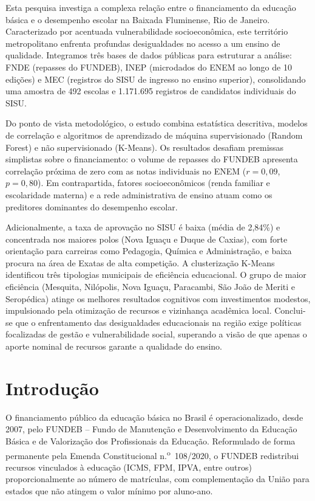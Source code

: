 \documentclass[12pt]{article}
\begin{document}
\begin{resumo}
Esta pesquisa investiga a complexa relação entre o financiamento da educação básica e o desempenho escolar na Baixada Fluminense, Rio de Janeiro. Caracterizado por acentuada vulnerabilidade socioeconômica, este território metropolitano enfrenta profundas desigualdades no acesso a um ensino de qualidade. Integramos três bases de dados públicas para estruturar a análise: FNDE (repasses do FUNDEB), INEP (microdados do ENEM ao longo de 10 edições) e MEC (registros do SISU de ingresso no ensino superior), consolidando uma amostra de 492 escolas e 1.171.695 registros de candidatos individuais do SISU.

Do ponto de vista metodológico, o estudo combina estatística descritiva, modelos de correlação e algoritmos de aprendizado de máquina supervisionado (Random Forest) e não supervisionado (K-Means). Os resultados desafiam premissas simplistas sobre o financiamento: o volume de repasses do FUNDEB apresenta correlação próxima de zero com as notas individuais no ENEM ($r = 0{,}09$, $p = 0{,}80$). Em contrapartida, fatores socioeconômicos (renda familiar e escolaridade materna) e a rede administrativa de ensino atuam como os preditores dominantes do desempenho escolar.

Adicionalmente, a taxa de aprovação no SISU é baixa (média de 2,84\%) e concentrada nos maiores polos (Nova Iguaçu e Duque de Caxias), com forte orientação para carreiras como Pedagogia, Química e Administração, e baixa procura na área de Exatas de alta competição. A clusterização K-Means identificou três tipologias municipais de eficiência educacional. O grupo de maior eficiência (Mesquita, Nilópolis, Nova Iguaçu, Paracambi, São João de Meriti e Seropédica) atinge os melhores resultados cognitivos com investimentos modestos, impulsionado pela otimização de recursos e vizinhança acadêmica local. Conclui-se que o enfrentamento das desigualdades educacionais na região exige políticas focalizadas de gestão e vulnerabilidade social, superando a visão de que apenas o aporte nominal de recursos garante a qualidade do ensino.
\end{resumo}

\section{Introdução}
\label{sec:intro}

O financiamento público da educação básica no Brasil é operacionalizado, desde 2007,
pelo FUNDEB -- Fundo de Manutenção e Desenvolvimento da Educação Básica e de
Valorização dos Profissionais da Educação. Reformulado de forma permanente pela Emenda
Constitucional n.\textsuperscript{o}~108/2020, o FUNDEB redistribui recursos vinculados
à educação (ICMS, FPM, IPVA, entre outros) proporcionalmente ao número de matrículas,
com complementação da União para estados que não atingem o valor mínimo por aluno-ano.
\end{document}
